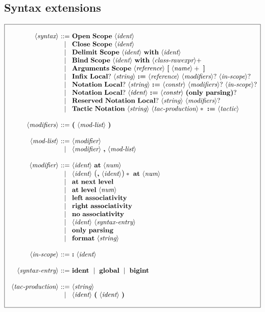 \documentclass{article}
\makeatletter
\def\GR#1{\text{\large(}#1\text{\large)}}
\def\NT#1{\langle\textit{#1}\rangle}
\def\TERM#1{{\bf\textrm{\bf #1}}}
\def\KWD#1{\TERM{#1}}
\def\STAR#1{#1*}
\def\STARGR#1{\GR{#1}*}
\def\PLUS#1{#1+}
\def\OPT#1{#1?}
\newenvironment{cadre}
        {\begin{array}{|c|}\hline\\}
        {\\\\\hline\end{array}}
\newenvironment{rulebox}
        {$$\begin{cadre}\begin{array}{r@{~}c@{~}l@{}l@{}r}}
        {\end{array}\end{cadre}$$}
\def\DEFNT#1{\NT{#1} & ::= &}
\def\SEPDEF{\\\\}
\def\nlsep{\\&|&}
\newenvironment{rules}
        {\begin{center}\begin{rulebox}}
        {\end{rulebox}\end{center}}
\makeatother
\begin{document}
\subsection{Syntax extensions}

\begin{rules}
\DEFNT{syntax}
       \TERM{Open}~\TERM{Scope}~\NT{ident}
\nlsep \TERM{Close}~\TERM{Scope}~\NT{ident}
\nlsep \TERM{Delimit}~\TERM{Scope}~\NT{ident}~\KWD{with}~\NT{ident}
\nlsep \TERM{Bind}~\TERM{Scope}~\NT{ident}~\KWD{with}~\PLUS{\NT{class-rawexpr}}
\nlsep \TERM{Arguments}~\TERM{Scope}~\NT{reference}
       ~\TERM{[}~\PLUS{\NT{name}}~\TERM{]}
\nlsep \TERM{Infix}~\OPT{\TERM{Local}} %
       ~\NT{string}~\KWD{:=}~\NT{reference}~\OPT{\NT{modifiers}}
       ~\OPT{\NT{in-scope}}
\nlsep \TERM{Notation}~\OPT{\TERM{Local}}~\NT{string}~\KWD{:=}~\NT{constr}
       ~\OPT{\NT{modifiers}}~\OPT{\NT{in-scope}}
\nlsep \TERM{Notation}~\OPT{\TERM{Local}}~\NT{ident}~\KWD{:=}~\NT{constr}
       ~\OPT{\KWD{(}\TERM{only~\TERM{parsing}\KWD{)}}}
\nlsep \TERM{Reserved}~\TERM{Notation}~\OPT{\TERM{Local}}~\NT{string}
       ~\OPT{\NT{modifiers}}
\nlsep \TERM{Tactic}~\TERM{Notation}~\NT{string}~\STAR{\NT{tac-production}}
       ~\KWD{:=}~\NT{tactic}
\SEPDEF
\DEFNT{modifiers}
       \KWD{(}~\NT{mod-list}~\KWD{)}
\SEPDEF
\DEFNT{mod-list}
       \NT{modifier}
\nlsep \NT{modifier}~\KWD{,}~\NT{mod-list}
\SEPDEF
\DEFNT{modifier}
       \NT{ident}~\KWD{at}~\NT{num}
\nlsep \NT{ident}~\STARGR{\KWD{,}~\NT{ident}}~\KWD{at}~\NT{num}
\nlsep \KWD{at}~\TERM{next}~\TERM{level}
\nlsep \KWD{at}~\TERM{level}~\NT{num}
\nlsep \TERM{left}~\TERM{associativity}
\nlsep \TERM{right}~\TERM{associativity}
\nlsep \TERM{no}~\TERM{associativity}
\nlsep \NT{ident}~\NT{syntax-entry}
\nlsep \TERM{only}~\TERM{parsing}
\nlsep \TERM{format}~\NT{string}
\SEPDEF
\DEFNT{in-scope}
       \KWD{:}~\NT{ident}
\SEPDEF
\DEFNT{syntax-entry}
       \TERM{ident}~\mid~\TERM{global}~\mid~\TERM{bigint}
\SEPDEF
\DEFNT{tac-production}
       \NT{string}
\nlsep \NT{ident}~\TERM{(}~\NT{ident}~\TERM{)}
\end{rules}
\end{document}
